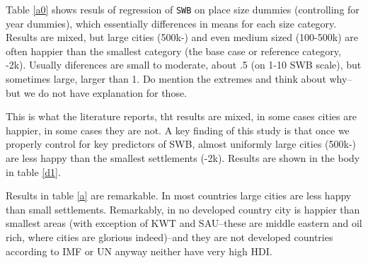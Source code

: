 \documentclass[10pt, letterpaper]{article}
\begin{document}
\begin{spacing}{1.4}
Table \ref{a0} shows resuls of regression of \texttt{SWB} on place size dummies
(controlling for year dummies), which essentially differences in means for each
size category. Results are mixed, but large cities (500k-) and even medium sized
(100-500k) are often happier than the smallest category (the base case or
reference category, -2k). Usually diferences are small to moderate, about .5 (on
1-10 SWB scale), but sometimes large, larger than 1. Do mention the extremes and
think about why--but we do not have explanation for those. 

This is what the literature reports, tht results are mixed, in some cases cities
are happier, in some cases they are not. A key finding of this study is that
once we properly control for key predictors of SWB, almost uniformly large
cities (500k-) are less happy than the smallest settlements (-2k). Results are
shown in the body in table \ref{d1}.



%         

Results in table \ref{a} are remarkable. In most countries large cities are less
happy than small settlements. Remarkably, in no developed country city is
happier than smallest areas (with exception of KWT and SAU--these are
middle eastern and oil rich, where cities are glorious indeed)--and they are not
developed countries according to IMF or UN anyway neither have very high HDI.

%         


\end{spacing}
\end{document}
